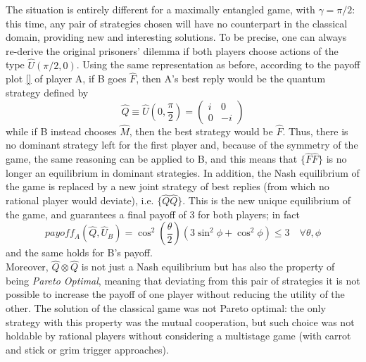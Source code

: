 The situation is entirely different for a maximally entangled game, with $\gamma=\pi/2$: this time, any pair of strategies chosen will have no counterpart in the classical domain, providing new and interesting solutions. To be precise, one can always re-derive the original prisoners' dilemma if both players choose actions of the type $\hat{U}(\pi/2,0)$. Using the same representation as before, according to the payoff plot \ref{} of player A, if B goes $\hat{F}$, then A's best reply would be the quantum strategy defined by
\[ \hat{Q} \equiv \hat{U}(0,\frac{\pi}{2}) = \begin{pmatrix} i&0\\0&-i \end{pmatrix} \]
while if B instead chooses $\hat{M}$, then the best strategy would be $\hat{F}$. Thus, there is no dominant strategy left for the first player and, because of the symmetry of the game, the same reasoning can be applied to B, and this means that $\{\hat{F}\hat{F}\}$ is no longer an equilibrium in dominant strategies. In addition, the Nash equilibrium of the game is replaced by a new joint strategy of best replies (from which no rational player would deviate), i.e. $\{\hat{Q}\hat{Q}\}$. This is the new unique equilibrium of the game, and guarantees a final payoff of 3 for both players; in fact
\[ payoff_A(\hat{Q},\hat{U}_B)=\cos^2\left(\frac{\theta}{2}\right)\left(3\sin^2\phi + \cos^2\phi \right)\leq 3 \quad \forall\theta,\phi \]
and the same holds for B's payoff.\\
Moreover, $\hat{Q}\otimes\hat{Q}$ is not just a Nash equilibrium but has also the property of being \textit{Pareto Optimal}, meaning that deviating from this pair of strategies it is not possible to increase the payoff of one player
without reducing the utility of the other. The solution of the classical game was not Pareto optimal: the only strategy with this property was the mutual cooperation, but such choice was not holdable by rational players without considering a multistage game (with carrot and stick or grim trigger approaches).\\

